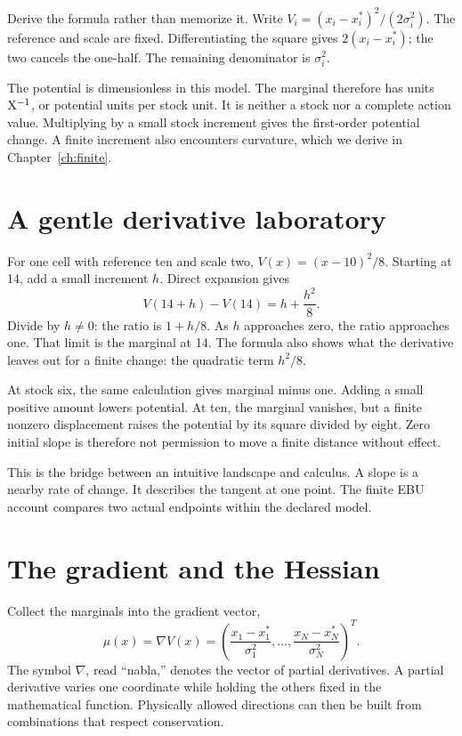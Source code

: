 Derive the formula rather than memorize it. Write \(V_i=(x_i-x_i^*)^2/(2\sigma_i^2)\). The reference and scale are fixed. Differentiating the square gives \(2(x_i-x_i^*)\); the two cancels the one-half. The remaining denominator is \(\sigma_i^2\).

The potential is dimensionless in this model. The marginal therefore has units \(\mathrm{X}^{-1}\), or potential units per stock unit. It is neither a stock nor a complete action value. Multiplying by a small stock increment gives the first-order potential change. A finite increment also encounters curvature, which we derive in Chapter~\ref{ch:finite}.

\section{A gentle derivative laboratory}
For one cell with reference ten and scale two, \(V(x)=(x-10)^2/8\). Starting at 14, add a small increment \(h\). Direct expansion gives
\begin{equation}
 V(14+h)-V(14)=h+\frac{h^2}{8}.
\end{equation}
Divide by \(h\neq0\): the ratio is \(1+h/8\). As \(h\) approaches zero, the ratio approaches one. That limit is the marginal at 14. The formula also shows what the derivative leaves out for a finite change: the quadratic term \(h^2/8\).

At stock six, the same calculation gives marginal minus one. Adding a small positive amount lowers potential. At ten, the marginal vanishes, but a finite nonzero displacement raises the potential by its square divided by eight. Zero initial slope is therefore not permission to move a finite distance without effect.

This is the bridge between an intuitive landscape and calculus. A slope is a nearby rate of change. It describes the tangent at one point. The finite EBU account compares two actual endpoints within the declared model.

\section{The gradient and the Hessian}
Collect the marginals into the gradient vector,
\begin{equation}
 \mu(x)=\nabla V(x)
       =\left(\frac{x_1-x_1^*}{\sigma_1^2},\ldots,
               \frac{x_N-x_N^*}{\sigma_N^2}\right)^T.
\end{equation}
The symbol \(\nabla\), read ``nabla,'' denotes the vector of partial derivatives. A partial derivative varies one coordinate while holding the others fixed in the mathematical function. Physically allowed directions can then be built from combinations that respect conservation.

